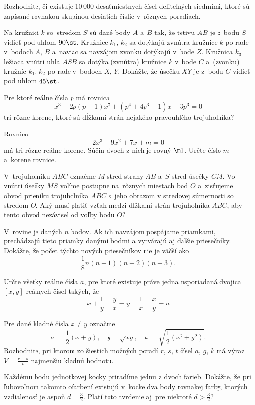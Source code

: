 {%
Rozhodnite, či existuje 10\,000 desaťmiestnych čísel
deliteľných siedmimi, ktoré sú zapísané rovnakou skupinou desiatich
číslic v~rôznych poradiach.
}

{%
Na kružnici $k$ so~stredom $S$ sú dané body $A$ a~$B$
tak, že tetivu $AB$ je z~bodu $S$ vidieť pod uhlom $90{\st}$.
Kružnice $k_1$, $k_2$ sa dotýkajú zvnútra
kružnice $k$ po rade v~bodoch $A$, $B$ a~naviac sa navzájom
zvonku dotýkajú v~bode $Z$. Kružnica $k_3$ ležiaca vnútri uhla $ASB$
sa dotýka (zvnútra) kružnice $k$ v~bode $C$ a~(zvonku) kružníc
$k_1$, $k_2$
po rade v~bodoch $X$, $Y$. Dokážte, že úsečku $XY$ je z~bodu $C$ vidieť pod
uhlom $45{\st}$.
}

{%
Pre ktoré reálne čísla $p$ má rovnica
$$
x^3-2p(p+1)x^2+(p^4+4p^3-1)x-3p^3 =0
$$
tri rôzne korene, ktoré sú dĺžkami strán nejakého pravouhlého
trojuholníka?
}

{%
Rovnica
$$
 2x^3 - 9x^2 + 7x + m = 0
$$
má tri rôzne reálne korene. Súčin dvoch z nich je rovný
$\m 1$. Určte číslo $m$ a~korene rovnice.}

{%
V~trojuholníku $ABC$ označme $M$ stred strany $AB$ a~$S$ stred
úsečky $CM$. Vo vnútri úsečky $MS$ volíme postupne na~rôznych miestach
bod $O$ a~zisťujeme obvod prieniku trojuholníka $ABC$ s~jeho
obrazom v stredovej súmernosti so stredom $O$. Aký musí platiť
vzťah medzi dĺžkami strán trojuholníka $ABC$, aby tento obvod
nezávisel od voľby bodu $O$?
}

{%
V~rovine je daných $n$ bodov. Ak ich navzájom pospájame
priamkami, prechádzajú tieto priamky danými bodmi a
vytvárajú aj ďalšie priesečníky. Dokážte, že počet týchto nových
priesečníkov nie je väčší ako
$$
 \frac18n(n-1)(n-2)(n-3) .
$$
}

{%
Určte všetky reálne čísla $a$, pre ktoré existuje práve jedna
usporiadaná dvojica $[x,y]$ reálnych čísel takých, že
$$
x + \dfrac{1}{y} - \dfrac{y}{x} = y + \dfrac{1}{x} - \dfrac{x}{y} = a
$$
}

{%
Pre dané kladné čísla $x\ne y$ označme
$$
 a~= \frac12(x+y),\quad g = \sqrt{xy},\quad k~=
\sqrt{\frac12(x^2+y^2)}.
$$
Rozhodnite, pri ktorom zo šiestich možných poradí $r$, $s$, $t$
čísel $a$, $g$, $k$ má výraz $V = \frac{r-s}t$ najmenšiu kladnú
hodnotu.
}

{%
Každému bodu jednotkovej kocky priradíme jednu z dvoch farieb.
Dokážte, že pri ľubovoľnom takomto ofarbení existujú v~kocke
dva body rovnakej farby, ktorých vzdialenosť je aspoň $d = \frac32$.
Platí toto tvrdenie aj~pre niektoré $d > \frac32 $?
}

